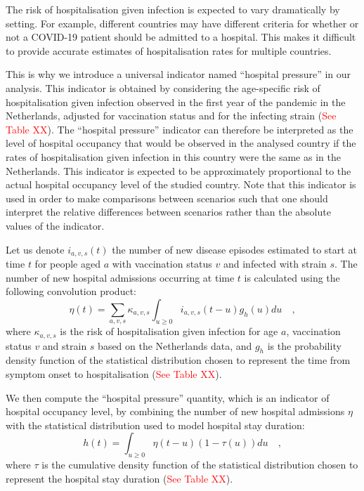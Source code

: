 The risk of hospitalisation given infection is expected to vary dramatically by setting.
For example, different countries may have different criteria for whether or not a COVID-19 
patient should be admitted to a hospital. This makes it difficult to provide accurate 
estimates of hospitalisation rates for multiple countries. 

This is why we introduce a universal indicator named ``hospital pressure'' in our analysis. This indicator
is obtained by considering the age-specific risk of hospitalisation given infection observed in the first year
of the pandemic in the Netherlands, adjusted for vaccination status and for the infecting strain (\textcolor{red}{See Table XX}).
The ``hospital pressure'' indicator can therefore be interpreted as the level of hospital occupancy that
would be observed in the analysed country if the rates of hospitalisation given infection in this country were the same
as in the Netherlands. This indicator is expected to be approximately proportional to the actual hospital occupancy level of the 
studied country. Note that this indicator is used in order to make comparisons between scenarios such that one should interpret the relative
differences between scenarios rather than the absolute values of the indicator. 

Let us denote $i_{a,v,s}(t)$ the number of new disease episodes estimated to start at time $t$ for people aged $a$ with vaccination status $v$
and infected with strain $s$. The number of new hospital admissions occurring at time $t$ is calculated using the following
convolution product:
\begin{equation}
 \eta(t) = \sum_{a,v,s} \kappa_{a,v,s} \int_{u \geq 0}  i_{a,v,s}(t-u)g_{h}(u) du   \quad,
 \end{equation}
where $\kappa_{a,v,s}$ is the risk of hospitalisation given infection for age $a$, vaccination status $v$ and strain $s$ 
based on the Netherlands data, and $g_h$ is the probability density function of the statistical distribution chosen to represent the 
time from symptom onset to hospitalisation (\textcolor{red}{See Table XX}). 

We then compute the ``hospital pressure'' quantity, which is an indicator of hospital occupancy level, by combining the number of new 
hospital admissions $\eta$ with the statistical distribution used to model hospital stay duration:
\begin{equation}
h(t) = \int_{u \geq 0}  \eta(t-u) (1 - \tau(u)) du   \quad,
\end{equation}
where $\tau$ is the cumulative density function of the statistical distribution chosen to represent the 
hospital stay duration (\textcolor{red}{See Table XX}). 
